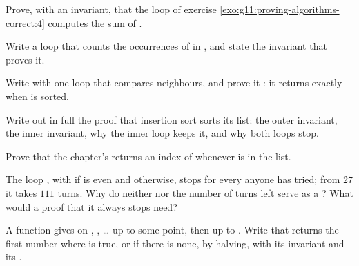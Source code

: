\begin{exercise}[$\star\star$]\label{exo:g11:proving-algorithms-correct:9}
Prove, with an invariant, that the loop of exercise \ref{exo:g11:proving-algorithms-correct:4} computes the sum of
.
\end{exercise}

\begin{exercise}[$\star\star$]\label{exo:g11:proving-algorithms-correct:10}
Write a loop that counts the occurrences of  in , and state the invariant that proves it.
\end{exercise}

\begin{exercise}[$\star\star$]\label{exo:g11:proving-algorithms-correct:11}
Write  with one loop that compares neighbours, and prove it : it returns  exactly
when  is sorted.
\end{exercise}

\begin{exercise}[$\star\star\star$]\label{exo:g11:proving-algorithms-correct:12}
Write out in full the proof that insertion sort sorts its list: the outer invariant, the inner invariant, why the
inner loop keeps it, and why both loops stop.
\end{exercise}

\begin{exercise}[$\star\star\star$]\label{exo:g11:proving-algorithms-correct:13}
Prove that the chapter's  returns an index of  whenever  is in the list.
\end{exercise}

\begin{exercise}[$\star\star\star$]\label{exo:g11:proving-algorithms-correct:14}
The loop , with  if  is even and  otherwise, stops for
every  anyone has tried; from $27$ it takes $111$ turns. Why do neither  nor the number of turns
left serve as a ? What would a proof that it always stops need?
\end{exercise}

\begin{exercise}[$\star\star\star$]\label{exo:g11:proving-algorithms-correct:15}
A function  gives  on , , \dots{} up to some point, then 
up to . Write  that returns the first number where  is true, or  if there is
none, by halving, with its invariant and its .
\end{exercise}

